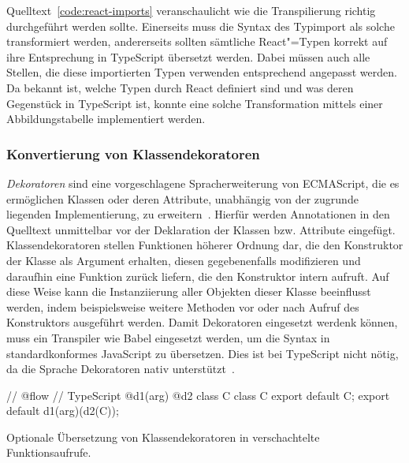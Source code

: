 Quelltext~\ref{code:react-imports} veranschaulicht wie die Transpilierung richtig durchgeführt werden sollte. Einerseits muss die Syntax des Typimport als solche transformiert werden, andererseits sollten sämtliche React"=Typen korrekt auf ihre Entsprechung in TypeScript übersetzt werden. Dabei müssen auch alle Stellen, die diese importierten Typen verwenden entsprechend angepasst werden. Da bekannt ist, welche Typen durch React definiert sind und was deren Gegenstück in TypeScript ist, konnte eine solche Transformation mittels einer Abbildungstabelle implementiert werden.

\subsubsection{Konvertierung von Klassendekoratoren}
\label{subsec:class-decorators}

\textit{Dekoratoren} sind eine vorgeschlagene Spracherweiterung von ECMAScript, die es ermöglichen Klassen oder deren Attribute, unabhängig von der zugrunde liegenden Implementierung, zu erweitern~\autocite{ES_PROPOSAL:DECORATORS}. Hierfür werden Annotationen in den Quelltext unmittelbar vor der Deklaration der Klassen bzw. Attribute eingefügt. Klassendekoratoren stellen Funktionen höherer Ordnung dar, die den Konstruktor der Klasse als Argument erhalten, diesen gegebenenfalls modifizieren und daraufhin eine Funktion zurück liefern, die den Konstruktor intern aufruft. Auf diese Weise kann die Instanziierung aller Objekten dieser Klasse beeinflusst werden, indem beispielsweise weitere Methoden vor oder nach Aufruf des Konstruktors ausgeführt werden. Damit Dekoratoren eingesetzt werdenk können, muss ein Transpiler wie Babel eingesetzt werden, um die Syntax in standardkonformes JavaScript zu übersetzen. Dies ist bei TypeScript nicht nötig, da die Sprache Dekoratoren nativ unterstützt~\autocite{TYPESCRIPT_HANDBOOK:DECORATORS}.

\bigbreak
\begin{listing}[htb]
\begin{textcode}
// @flow                                        // TypeScript
@d1(arg)
@d2
class C {}                                      class C {}
export default C;                               export default d1(arg)(d2(C));
\end{textcode}
\listingvspace
\caption{Optionale Übersetzung von Klassendekoratoren in verschachtelte Funktionsaufrufe.}
\label{code:class-decorators}
\end{listing}


